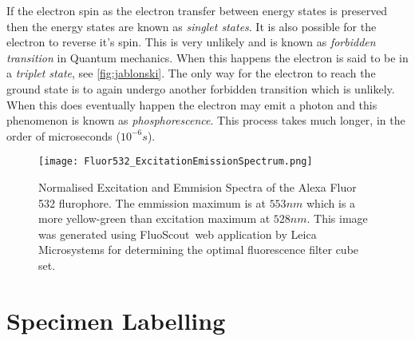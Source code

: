 

\begin{definition}
	If the electron spin as the electron transfer between energy states is preserved then the energy states are known as \textit{singlet states}. It is also possible for the electron to reverse it's spin. This is very unlikely and is known as \textit{forbidden transition} in Quantum mechanics. When this happens the electron is said to be in a \textit{triplet state}, see \autoref{fig:jablonski}. The only way for the electron to reach the ground state is to again undergo another forbidden transition which is unlikely. When this does eventually happen the electron may emit a photon and this phenomenon is known as \textit{phosphorescence}. This process takes much longer, in the order of microseconds ($10^{-6}s$).
\end{definition}


\begin{figure}[!t]
	\centering
	\texttt{[image: Fluor532\_ExcitationEmissionSpectrum.png]}
	\caption{Normalised Excitation and Emmision Spectra of the Alexa Fluor 532 flurophore. The emmission maximum is at $553nm$ which is a more yellow-green than excitation maximum at $528nm$. This image was generated using FluoScout\texttrademark\, web application by Leica Microsystems for determining the optimal fluorescence filter cube set. %
	}
	\label{fig:excitationandemissionspectra}
\end{figure}


\section{Specimen Labelling}
\label{sec:SpecimenLabelling}

